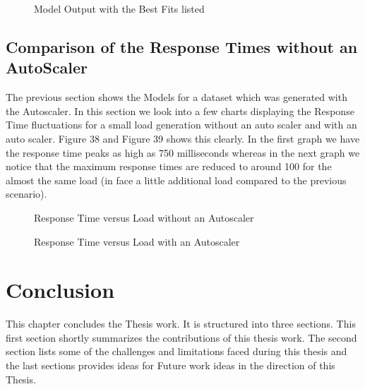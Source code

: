 \documentclass[article,type=msc,colorback,12pt,accentcolor=tud7b,table]{tudthesis}
\begin{document}
   \begin{figure}[H]
		    	\begin{center}
		    		\makebox[\textwidth]{\texttt{[image: E14]}}
		    	\end{center}
		    	\caption{Model Output with the Best Fits listed}
   \end{figure}

\subsection{Comparison of the Response Times without an AutoScaler}
The previous section shows the Models for a dataset which was generated with the Autoscaler. In this section we look into a few charts displaying the Response Time fluctuations for a small load generation without an auto scaler and with an auto scaler. Figure 38 and Figure 39 shows this clearly. In the first graph we have the response time peaks as high as 750 milliseconds whereas in the next graph we notice that the maximum response times are reduced to around 100 for the almost the same load (in face a little additional load compared to the previous scenario).

   \begin{figure}[H]
   	\begin{center}
   		\makebox[\textwidth]{\texttt{[image: E15]}}
   	\end{center}
   	\caption{Response Time versus Load without an Autoscaler}
   \end{figure}
   
      \begin{figure}[H]
      	\begin{center}
      		\makebox[\textwidth]{\texttt{[image: E16]}}
      	\end{center}
      	\caption{Response Time versus Load with an Autoscaler}
      \end{figure}

\cleardoublepage
\section{Conclusion}	 

This chapter concludes the Thesis work. It is structured into three sections. This first section shortly summarizes the contributions of this thesis work. The second section lists some of the challenges and limitations faced during this thesis and the last sections provides ideas for Future work ideas in the direction of this Thesis.
 
\end{document}
